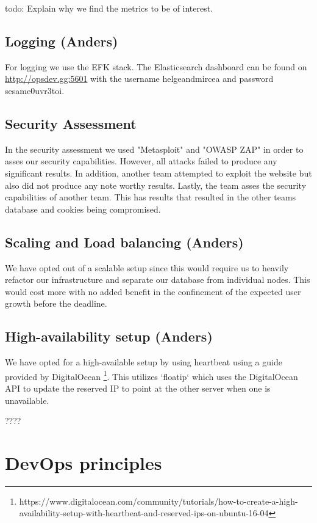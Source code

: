 \documentclass{article}
\begin{document}
{todo: Explain why we find the metrics to be of interest.

\subsection{Logging (Anders)}

For logging we use the EFK stack. The Elasticsearch dashboard can be found on \url{http://opsdev.gg:5601} with the username helgeandmircea and password sesame0uvr3toi.

\subsection{Security Assessment}

In the security assessment we used "Metasploit" and "OWASP ZAP" in order to asses our security capabilities. However, all attacks failed to produce any significant results. 
In addition, another team  attempted to exploit the website but also did not produce any note worthy results. 
Lastly, the team asses the security capabilities of another team. This has results that resulted in the other teams database and cookies being compromised.
 

\subsection{Scaling and Load balancing (Anders)}

We have opted out of a scalable setup since this would require us to heavily refactor our infrastructure and separate our database from individual nodes. This would cost more with no added benefit in the confinement of the expected user growth before the deadline.  

\subsection{High-availability setup (Anders)}

We have opted for a high-available setup by using heartbeat using a guide provided by DigitalOcean \footnote{https://www.digitalocean.com/community/tutorials/how-to-create-a-high-availability-setup-with-heartbeat-and-reserved-ips-on-ubuntu-16-04}. This utilizes `floatip` which uses the DigitalOcean API to update the reserved IP to point at the other server when one is unavailable. 

????


\section{DevOps principles}

}
\end{document}
